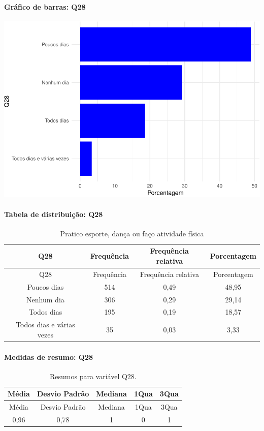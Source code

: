 \documentclass[]{article}
\let\oldparagraph\paragraph
\renewcommand{\paragraph}[1]{\oldparagraph{#1}\mbox{}}
\begin{document}
\hypertarget{gruxe1fico-de-barras-q28}{%
\paragraph{Gráfico de barras: Q28}\label{gruxe1fico-de-barras-q28}}

\begin{center}\includegraphics[width=0.75\linewidth]{relatorio_covid19_files/figure-latex/unnamed-chunk-836-1} \end{center}

\hypertarget{tabela-de-distribuiuxe7uxe3o-q28}{%
\paragraph{Tabela de distribuição: Q28}\label{tabela-de-distribuiuxe7uxe3o-q28}}

\begin{longtable}[]{@{}cccc@{}}
\caption{\label{tab:unnamed-chunk-837}Pratico esporte, dança ou faço atividade física}\tabularnewline
\toprule
Q28 & Frequência & Frequência relativa & Porcentagem\tabularnewline
\midrule
\endfirsthead
\toprule
Q28 & Frequência & Frequência relativa & Porcentagem\tabularnewline
\midrule
\endhead
Poucos dias & 514 & 0,49 & 48,95\tabularnewline
Nenhum dia & 306 & 0,29 & 29,14\tabularnewline
Todos dias & 195 & 0,19 & 18,57\tabularnewline
Todos dias e várias vezes & 35 & 0,03 & 3,33\tabularnewline
\bottomrule
\end{longtable}

\hypertarget{medidas-de-resumo-q28}{%
\paragraph{Medidas de resumo: Q28}\label{medidas-de-resumo-q28}}

\begin{longtable}[]{@{}ccccc@{}}
\caption{\label{tab:unnamed-chunk-838}Resumos para variável Q28.}\tabularnewline
\toprule
Média & Desvio Padrão & Mediana & 1Qua & 3Qua\tabularnewline
\midrule
\endfirsthead
\toprule
Média & Desvio Padrão & Mediana & 1Qua & 3Qua\tabularnewline
\midrule
\endhead
0,96 & 0,78 & 1 & 0 & 1\tabularnewline
\bottomrule
\end{longtable}
\end{document}
